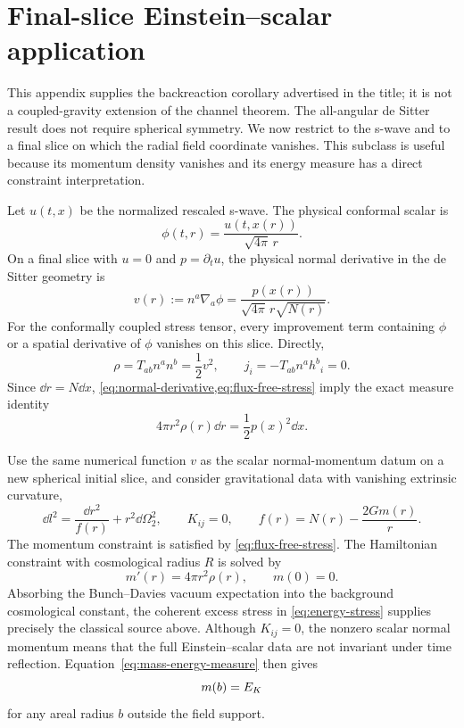 \section{Final-slice Einstein--scalar application}
\label{sec:gravity}

This appendix supplies the backreaction corollary advertised in the title; it
is not a coupled-gravity extension of the channel theorem.  The all-angular de
Sitter result does not require spherical symmetry.  We now restrict to the
s-wave and to a final slice on which the radial field coordinate vanishes.
This subclass is useful because its momentum density vanishes and its energy
measure has a direct constraint interpretation.

Let $u(t,x)$ be the normalized rescaled s-wave.  The physical conformal scalar
is
\begin{equation}
 \phi(t,r)=\frac{u(t,x(r))}{\sqrt{4\pi}\,r}.
 \label{eq:physical-radial-field}
\end{equation}
On a final slice with $u=0$ and $p=\partial_tu$, the physical normal derivative
in the de Sitter geometry is
\begin{equation}
 v(r):=n^a\nabla_a\phi
 =\frac{p(x(r))}{\sqrt{4\pi}\,r\sqrt{N(r)}}.
 \label{eq:normal-derivative}
\end{equation}
For the conformally coupled stress tensor, every improvement term containing
$\phi$ or a spatial derivative of $\phi$ vanishes on this slice.  Directly,
\begin{equation}
 \rho=T_{ab}n^an^b=\frac12v^2,
 \qquad
 j_i=-T_{ab}n^ah^b{}_i=0.
 \label{eq:flux-free-stress}
\end{equation}
Since $\dd r=N\dd x$, \cref{eq:normal-derivative,eq:flux-free-stress} imply
the exact measure identity
\begin{equation}
 4\pi r^2\rho(r)\dd r=\frac12p(x)^2\dd x.
 \label{eq:mass-energy-measure}
\end{equation}

Use the same numerical function $v$ as the scalar normal-momentum datum on a
new spherical initial slice, and consider gravitational data with vanishing
extrinsic curvature,
\begin{equation}
 \dd l^2=\frac{\dd r^2}{f(r)}+r^2\dd\Omega_2^2,
 \qquad K_{ij}=0,
 \qquad
 f(r)=N(r)-\frac{2Gm(r)}{r}.
 \label{eq:constraint-metric}
\end{equation}
The momentum constraint is satisfied by \cref{eq:flux-free-stress}.  The
Hamiltonian constraint with cosmological radius $R$ is solved by
\begin{equation}
 m'(r)=4\pi r^2\rho(r),
 \qquad m(0)=0.
 \label{eq:mass-constraint}
\end{equation}
Absorbing the Bunch--Davies vacuum expectation into the background
cosmological constant, the coherent excess stress in
\cref{eq:energy-stress} supplies precisely the classical source above.
Although $K_{ij}=0$, the nonzero scalar normal momentum means that the full
Einstein--scalar data are not invariant under time reflection.
Equation~\eqref{eq:mass-energy-measure} then gives
\begin{equation}
 m(b)=E_{K}
 \label{eq:mass-equals-energy}
\end{equation}
for any areal radius $b$ outside the field support.

